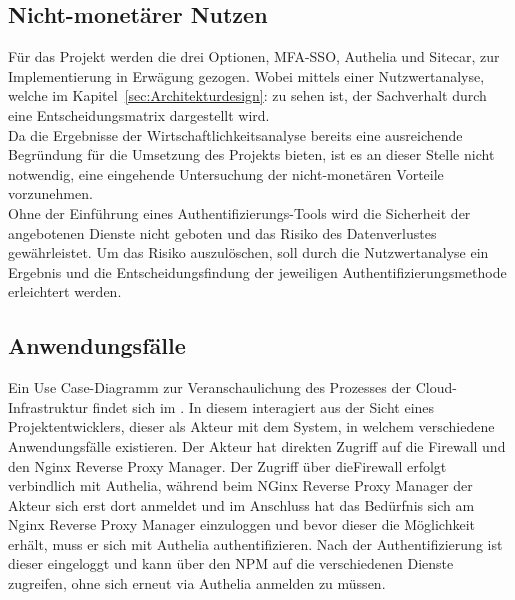 \subsection{Nicht-monetärer Nutzen}
\label{sec:Nicht-monetärer Nutzen}
Für das Projekt werden die drei Optionen, MFA-SSO, Authelia und Sitecar, zur Implementierung in Erwägung gezogen. Wobei mittels einer 
Nutzwertanalyse, welche im Kapitel~\ref{sec:Architekturdesign}:  zu sehen ist, der Sachverhalt durch 
eine Entscheidungsmatrix dargestellt wird.
\\Da die Ergebnisse der Wirtschaftlichkeitsanalyse bereits eine ausreichende Begründung für die Umsetzung des Projekts bieten, 
ist es an dieser Stelle nicht notwendig, eine eingehende Untersuchung der nicht-monetären Vorteile vorzunehmen.
\\Ohne der Einführung eines Authentifizierungs-Tools wird die Sicherheit der angebotenen Dienste nicht geboten und das Risiko des 
Datenverlustes gewährleistet. Um das Risiko auszulöschen, soll durch die Nutzwertanalyse ein Ergebnis und die Entscheidungsfindung 
der jeweiligen Authentifizierungsmethode erleichtert werden.


\subsection{Anwendungsfälle}
\label{sec:Anwendungsfaelle}
Ein Use Case-Diagramm zur Veranschaulichung des Prozesses der Cloud-Infrastruktur findet sich im .
In diesem interagiert aus der Sicht eines Projektentwicklers, dieser als Akteur mit dem System, in welchem verschiedene 
Anwendungsfälle existieren. Der Akteur hat direkten Zugriff auf die Firewall und den Nginx Reverse Proxy Manager. Der Zugriff 
über dieFirewall erfolgt verbindlich mit Authelia, während beim NGinx Reverse Proxy Manager der Akteur sich erst dort anmeldet und im 
Anschluss 
hat das Bedürfnis sich am Nginx 
Reverse Proxy Manager einzuloggen und bevor dieser die Möglichkeit erhält, muss er sich mit Authelia authentifizieren. Nach der 
Authentifizierung ist dieser eingeloggt und kann über den NPM auf die verschiedenen Dienste zugreifen, ohne sich erneut via 
Authelia anmelden zu müssen.
